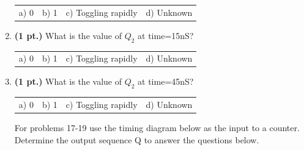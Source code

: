 \documentclass{article}
\begin{document}
\begin{enumerate}
\begin{tabular}{p{0.6in} p{0.6in} p{1.2in} l}
a) 0 & b) 1 & c) Toggling rapidly & d) Unknown 
\end{tabular}

\item {\bf (1 pt.)} What is the value of $Q_2$ at time=15nS?

\begin{tabular}{p{0.6in} p{0.6in} p{1.2in} l}
a) 0 & b) 1 & c) Toggling rapidly & d) Unknown 
\end{tabular}

\item {\bf (1 pt.)} What is the value of $Q_2$ at time=45nS?

\begin{tabular}{p{0.6in} p{0.6in} p{1.2in} l}
a) 0 & b) 1 & c) Toggling rapidly & d) Unknown 
\end{tabular}


\pagebreak
For problems 17-19 use the timing diagram below as the 
input to a counter.  Determine the output sequence Q to answer 
the questions below.



\end{enumerate}
\end{document}
